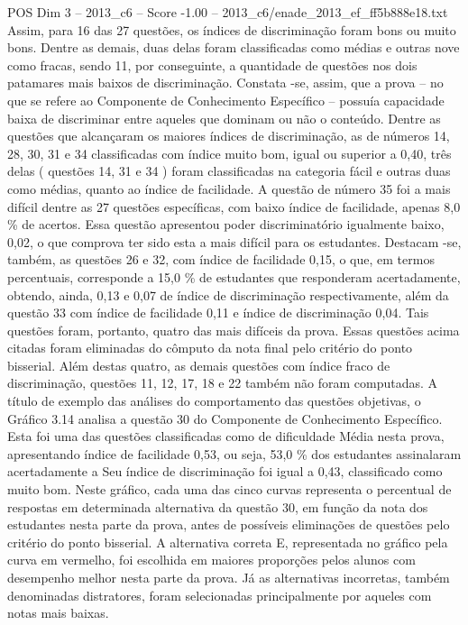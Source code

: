 \begin{textsample}{POS Dim 3 – 2013\_c6 – Score -1.00 – 2013\_c6/enade\_2013\_ef\_ff5b888e18.txt}
Assim, para 16 das 27 questões, os índices de discriminação foram bons ou muito bons.
Dentre as demais, duas delas foram classificadas como médias e outras nove como fracas, sendo 11, por conseguinte, a quantidade de questões nos dois patamares mais baixos de discriminação.
Constata -se, assim, que a prova – no que se refere ao Componente de Conhecimento Específico – possuía capacidade baixa de discriminar entre aqueles que dominam ou não o conteúdo.
Dentre as questões que alcançaram os maiores índices de discriminação, as de números 14, 28, 30, 31 e 34 classificadas com índice muito bom, igual ou superior a 0,40, três delas ( questões 14, 31 e 34 ) foram classificadas na categoria fácil e outras duas como médias, quanto ao índice de facilidade.
A questão de número 35 foi a mais difícil dentre as 27 questões específicas, com baixo índice de facilidade, apenas 8,0 \% de acertos.
Essa questão apresentou poder discriminatório igualmente baixo, 0,02, o que comprova ter sido esta a mais difícil para os estudantes.
Destacam -se, também, as questões 26 e 32, com índice de facilidade 0,15, o que, em termos percentuais, corresponde a 15,0 \% de estudantes que responderam acertadamente, obtendo, ainda, 0,13 e 0,07 de índice de discriminação respectivamente, além da questão 33 com índice de facilidade 0,11 e índice de discriminação 0,04.
Tais questões foram, portanto, quatro das mais difíceis da prova.
Essas questões acima citadas foram eliminadas do cômputo da nota final pelo critério do ponto bisserial.
Além destas quatro, as demais questões com índice fraco de discriminação, questões 11, 12, 17, 18 e 22 também não foram computadas.
A título de exemplo das análises do comportamento das questões objetivas, o Gráfico 3.14 analisa a questão 30 do Componente de Conhecimento Específico.
Esta foi uma das questões classificadas como de dificuldade Média nesta prova, apresentando índice de facilidade 0,53, ou seja, 53,0 \% dos estudantes assinalaram acertadamente a Seu índice de discriminação foi igual a 0,43, classificado como muito bom.
Neste gráfico, cada uma das cinco curvas representa o percentual de respostas em determinada alternativa da questão 30, em função da nota dos estudantes nesta parte da prova, antes de possíveis eliminações de questões pelo critério do ponto bisserial.
A alternativa correta E, representada no gráfico pela curva em vermelho, foi escolhida em maiores proporções pelos alunos com desempenho melhor nesta parte da prova.
Já as alternativas incorretas, também denominadas distratores, foram selecionadas principalmente por aqueles com notas mais baixas.

\end{textsample}
